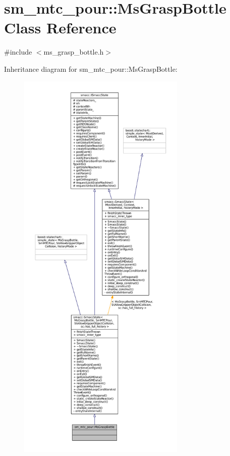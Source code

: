 \hypertarget{classsm__mtc__pour_1_1MsGraspBottle}{}\section{sm\+\_\+mtc\+\_\+pour\+:\+:Ms\+Grasp\+Bottle Class Reference}
\label{classsm__mtc__pour_1_1MsGraspBottle}


{\ttfamily \#include $<$ms\+\_\+grasp\+\_\+bottle.\+h$>$}



Inheritance diagram for sm\+\_\+mtc\+\_\+pour\+:\+:Ms\+Grasp\+Bottle\+:
\nopagebreak
\begin{figure}[H]
\begin{center}
\leavevmode
\includegraphics[height=550pt]{classsm__mtc__pour_1_1MsGraspBottle__inherit__graph}
\end{center}
\end{figure}


